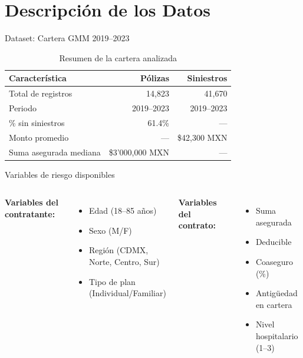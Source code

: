 \documentclass[aspectratio=169, 12pt]{beamer}
\begin{document}
\section{Descripción de los Datos}

\begin{frame}{Dataset: Cartera GMM 2019–2023}
  \begin{table}
    \centering
    \caption{Resumen de la cartera analizada}
    \begin{tabular}{lrr}
      \toprule
      \textbf{Característica} & \textbf{Pólizas} & \textbf{Siniestros} \\
      \midrule
      Total de registros & 14,823 & 41,670 \\
      Periodo & 2019–2023 & 2019–2023 \\
      \% sin siniestros & 61.4\% & — \\
      Monto promedio & — & \$42,300 MXN \\
      Suma asegurada mediana & \$3'000,000 MXN & — \\
      \bottomrule
    \end{tabular}
  \end{table}
\end{frame}

\begin{frame}{Variables de riesgo disponibles}
  \begin{columns}
      \textbf{Variables del contratante:}
      \begin{itemize}
        \item Edad (18–85 años)
        \item Sexo (M/F)
        \item Región (CDMX, Norte, Centro, Sur)
        \item Tipo de plan (Individual/Familiar)
      \end{itemize}
      \textbf{Variables del contrato:}
      \begin{itemize}
        \item Suma asegurada
        \item Deducible
        \item Coaseguro (\%)
        \item Antigüedad en cartera
        \item Nivel hospitalario (1–3)
      \end{itemize}
  \end{columns}
\end{frame}
\end{document}

